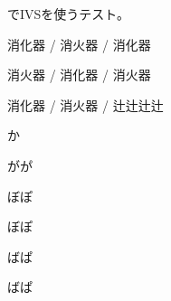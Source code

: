 \documentclass{article}
\begin{document}
 でIVSを使うテスト。

消󠄀化󠄀器󠄂 / 消󠄁火器󠄃 / 消󠄂化󠄁器󠄄

消󠄃火器󠄅 / 消化󠄂器󠄆 / 消火器󠄇

消化󠄃器󠄈 / 消火器󠄉 / 辻󠄂辻󠄃辻󠄄辻󠄅　


か

がか゚

ぼぽ

ぼぽ

ばぱ

ばぱ
\end{document}
